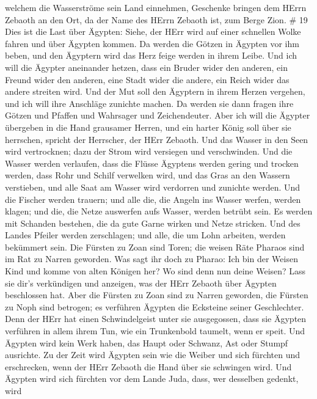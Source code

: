 welchem die Wasserströme sein Land einnehmen, Geschenke bringen dem
HErrn Zebaoth an den Ort, da der Name des HErrn Zebaoth ist, zum Berge
Zion. \# 19  Dies ist die Last über Ägypten: Siehe, der HErr
wird auf einer schnellen Wolke fahren und über Ägypten kommen. Da werden
die Götzen in Ägypten vor ihm beben, und den Ägyptern wird das Herz
feige werden in ihrem Leibe.  Und ich will die Ägypter
aneinander hetzen, dass ein Bruder wider den anderen, ein Freund wider
den anderen, eine Stadt wider die andere, ein Reich wider das andere
streiten wird.  Und der Mut soll den Ägyptern in ihrem
Herzen vergehen, und ich will ihre Anschläge zunichte machen. Da werden
sie dann fragen ihre Götzen und Pfaffen und Wahrsager und Zeichendeuter.
 Aber ich will die Ägypter übergeben in die Hand grausamer
Herren, und ein harter König soll über sie herrschen, spricht der
Herrscher, der HErr Zebaoth.  Und das Wasser in den Seen
wird vertrocknen; dazu der Strom wird versiegen und verschwinden.
 Und die Wasser werden verlaufen, dass die Flüsse Ägyptens
werden gering und trocken werden, dass Rohr und Schilf verwelken wird,
 und das Gras an den Wassern verstieben, und alle Saat am
Wasser wird verdorren und zunichte werden.  Und die Fischer
werden trauern; und alle die, die Angeln ins Wasser werfen, werden
klagen; und die, die Netze auswerfen aufs Wasser, werden betrübt sein.
 Es werden mit Schanden bestehen, die da gute Garne wirken
und Netze stricken.  Und des Landes Pfeiler werden
zerschlagen; und alle, die um Lohn arbeiten, werden bekümmert sein.
 Die Fürsten zu Zoan sind Toren; die weisen Räte Pharaos
sind im Rat zu Narren geworden. Was sagt ihr doch zu Pharao: Ich bin der
Weisen Kind und komme von alten Königen her?  Wo sind denn
nun deine Weisen? Lass sie dir's verkündigen und anzeigen, was der HErr
Zebaoth über Ägypten beschlossen hat.  Aber die Fürsten zu
Zoan sind zu Narren geworden, die Fürsten zu Noph sind betrogen; es
verführen Ägypten die Ecksteine seiner Geschlechter.  Denn
der HErr hat einen Schwindelgeist unter sie ausgegossen, dass sie
Ägypten verführen in allem ihrem Tun, wie ein Trunkenbold taumelt, wenn
er speit.  Und Ägypten wird kein Werk haben, das Haupt oder
Schwanz, Ast oder Stumpf ausrichte.  Zu der Zeit wird
Ägypten sein wie die Weiber und sich fürchten und erschrecken, wenn der
HErr Zebaoth die Hand über sie schwingen wird.  Und Ägypten
wird sich fürchten vor dem Lande Juda, dass, wer desselben gedenkt, wird
